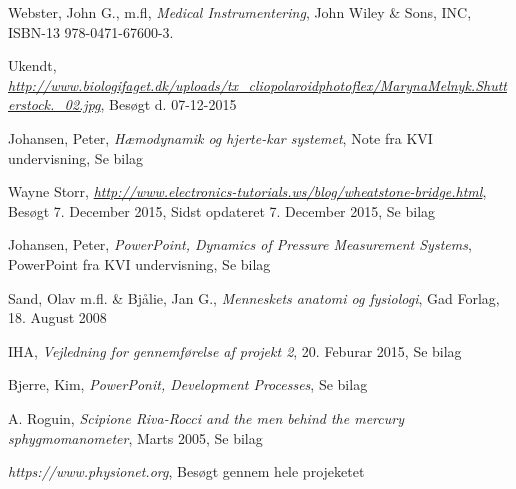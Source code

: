 \begin{thebibliography}{9}
	Webster, John G., m.fl, 
	\emph{Medical Instrumentering},
	John Wiley \& Sons, INC, 
	ISBN-13 978-0471-67600-3.
	
	Ukendt,
	\emph{\url{http://www.biologifaget.dk/uploads/tx_cliopolaroidphotoflex/MarynaMelnyk.Shutterstock._02.jpg}},
	Besøgt d. 07-12-2015	
	
	Johansen, Peter, 
	\emph{Hæmodynamik og hjerte-kar systemet},
	Note fra KVI undervisning, 
	Se bilag
	
	 Wayne Storr, 
	 \emph{\url{http://www.electronics-tutorials.ws/blog/wheatstone-bridge.html}}, 
	 Besøgt 7. December 2015,
	 Sidst opdateret 7. December 2015,
	 Se bilag
	 
	 Johansen, Peter, 
	 \emph{PowerPoint, Dynamics of Pressure Measurement Systems},
	 PowerPoint fra KVI undervisning, 
	 Se bilag
	 
	 Sand, Olav m.fl. \& Bjålie, Jan G., 
	 \emph{Menneskets anatomi og fysiologi},
	 Gad Forlag, 
	 18. August 2008
	 
	 IHA, 
	 \emph{Vejledning for gennemførelse af projekt 2},
	 20. Feburar 2015,
	 Se bilag
	 
	 Bjerre, Kim, 
	 \emph{PowerPonit, Development Processes},
	 Se bilag
	 
	 A. Roguin, 
	 \emph{Scipione Riva-Rocci and the men behind the mercury sphygmomanometer},
	 Marts 2005,
	 Se bilag
	 
	 \emph{https://www.physionet.org}, 
	 Besøgt gennem hele projeketet
	 
\end{thebibliography}
